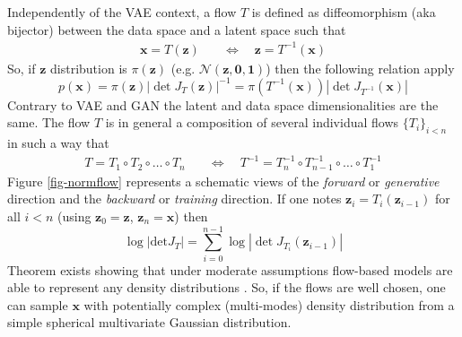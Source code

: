 \documentclass[11pt]{amsart}
\begin{document}
Independently of the VAE context, a flow $T$ is defined as diffeomorphism (aka bijector) between the data space and a latent space such that
\begin{align}
\bm{x} = T(\bm{z}) & \quad \Leftrightarrow \quad \bm{z} = T^{-1}(\bm{x})
\end{align}
So, if $\bm{z}$ distribution is $\pi(\bm{z})$ (e.g. $\mathcal{N}(\bm{z},\bm{0},\bm{1})$) then the following relation apply
\begin{equation}
p(\bm{x}) =  \pi(\bm{z})|\det J_T(\bm{z})|^{-1} = \pi(T^{-1}(\bm{x}))|\det J_{T^{-1}}(\bm{x})|
\end{equation}
Contrary to VAE and GAN the latent and data space dimensionalities are the same. The flow $T$ is in general a composition of several individual flows $\{T_i\}_{i<n}$ in such a way that
\begin{align}
T=T_1\circ T_2\circ \dots \circ T_n & \quad \Leftrightarrow \quad 
T^{-1}=T_n^{-1}\circ T_{n-1}^{-1}\circ \dots \circ T_1^{-1}
\end{align}
Figure \ref{fig-normflow} represents a schematic views of the \textit{forward} or \textit{generative} direction and the \textit{backward} or \textit{training} direction. 
If one notes $\bm{z}_i = T_i(\bm{z}_{i-1})$ for all $i<n$  (using $\bm{z}_0=\bm{z}$, $\bm{z}_n=\bm{x}$) then
\begin{equation}
\log |\mathrm{det} J_T| = \sum_{i=0}^{n-1} \log |\det J_{T_i}(\bm{z}_{i-1})|
\label{eq-flow-jacob}
\end{equation}
Theorem exists showing that under moderate assumptions flow-based models are able to represent any density distributions \citep{Bogachev2005,huang2019solving}. So, if the flows are well chosen, one can sample $\bm{x}$ with potentially complex (multi-modes) density distribution from a simple spherical multivariate Gaussian distribution.
\end{document}
